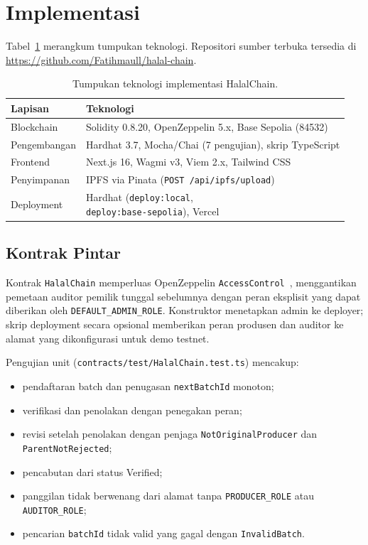 \section{Implementasi}
\label{sec:implementation}

Tabel~\ref{tab:stack} merangkum tumpukan teknologi.
Repositori sumber terbuka tersedia di \url{https://github.com/Fatihmaull/halal-chain}.

\begin{table}[t]
  \caption{Tumpukan teknologi implementasi HalalChain.}
  \label{tab:stack}
  \centering
  \footnotesize
  \setlength{\tabcolsep}{3pt}
  \begin{tabularx}{\columnwidth}{@{}>{\raggedright\arraybackslash}p{}X@{}}
    \toprule
    \textbf{Lapisan} & \textbf{Teknologi} \\
    \midrule
    Blockchain & Solidity 0.8.20, OpenZeppelin 5.x, Base Sepolia (84532) \\
    Pengembangan & Hardhat 3.7, Mocha/Chai (7 pengujian), skrip TypeScript \\
    Frontend & Next.js 16, Wagmi v3, Viem 2.x, Tailwind CSS \\
    Penyimpanan & IPFS via Pinata (\texttt{POST /api/ipfs/upload}) \\
    Deployment & \makecell[tl]{Hardhat (\texttt{deploy:local},\\\texttt{deploy:base-sepolia}), Vercel} \\
    \bottomrule
  \end{tabularx}
\end{table}

\subsection{Kontrak Pintar}
Kontrak \texttt{HalalChain} memperluas OpenZeppelin \texttt{AccessControl}~\cite{openzeppelin2024access}, menggantikan pemetaan auditor pemilik tunggal sebelumnya dengan peran eksplisit yang dapat diberikan oleh \texttt{DEFAULT\_ADMIN\_ROLE}.
Konstruktor menetapkan admin ke deployer; skrip deployment secara opsional memberikan peran produsen dan auditor ke alamat yang dikonfigurasi untuk demo testnet.

Pengujian unit (\texttt{contracts/test/HalalChain.test.ts}) mencakup:
\begin{itemize}
  \item pendaftaran batch dan penugasan \texttt{nextBatchId} monoton;
  \item verifikasi dan penolakan dengan penegakan peran;
  \item revisi setelah penolakan dengan penjaga \texttt{NotOriginalProducer} dan \texttt{ParentNotRejected};
  \item pencabutan dari status Verified;
  \item panggilan tidak berwenang dari alamat tanpa \texttt{PRODUCER\_ROLE} atau \texttt{AUDITOR\_ROLE};
  \item pencarian \texttt{batchId} tidak valid yang gagal dengan \texttt{InvalidBatch}.
\end{itemize}


